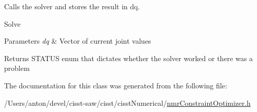 Calls the solver and stores the result in dq. 

Solve 
\begin{DoxyParams}{Parameters}
{\em dq} & Vector of current joint values \\
\hline
\end{DoxyParams}
\begin{DoxyReturn}{Returns}
S\+T\+A\+T\+U\+S enum that dictates whether the solver worked or there was a problem 
\end{DoxyReturn}


The documentation for this class was generated from the following file\+:\begin{DoxyCompactItemize}
\item 
/\+Users/anton/devel/cisst-\/saw/cisst/cisst\+Numerical/\hyperlink{nmr_constraint_optimizer_8h}{nmr\+Constraint\+Optimizer.\+h}\end{DoxyCompactItemize}
